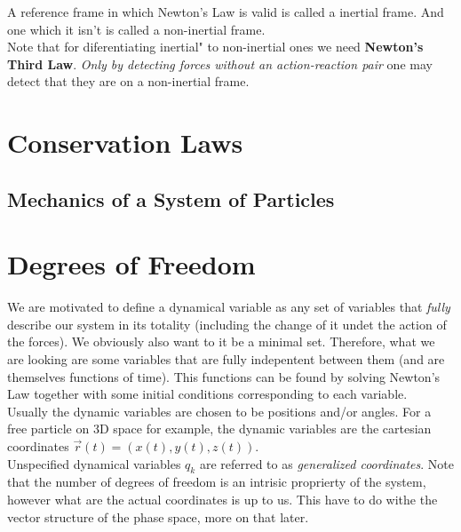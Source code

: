 \documentclass[english, a4paper,12pt]{Iart}
\theoremstyle{plain} %
\theoremstyle{remark}
\theoremstyle{definition}
\begin{document}
			A reference frame in which Newton's Law is valid is called a inertial frame. And one
			which it isn't is called a non-inertial frame.\\
			Note that for diferentiating inertial" to non-inertial ones we need \textbf{Newton's Third
			Law}. \textit{Only by detecting forces without an action-reaction pair} one may detect that they are on a 
			non-inertial frame.\\
			




		\section{Conservation Laws}

		\subsection{Mechanics of a System of Particles}
		
		\section{Degrees of Freedom}
		We are motivated to define a dynamical variable
		as any set of variables that \textit{fully}
		describe our system in its totality (including
		the change of it undet the action of the forces).
		We obviously also want to it be a minimal set.
		Therefore, what we are looking are some variables
		that are fully indepentent between them (and
		are themselves functions of time). This functions
		can be found by solving Newton's Law together
		with some initial conditions corresponding to
		each variable.\\
		Usually the dynamic variables are chosen to be
		positions and/or angles. For a free particle on
		3D space for example, the dynamic variables are the 
		cartesian coordinates $\vec{r}(t) = (x(t), y(t),
		z(t))$.\\
		Unspecified dynamical variables $q_k$ are
		referred to as \textit{generalized coordinates}.
		Note that the number of degrees of freedom is an
		intrisic proprierty of the system, however what
		are the actual coordinates is up to us. This have
		to do withe the vector structure of the phase
		space, more on that later.\\
\end{document}
